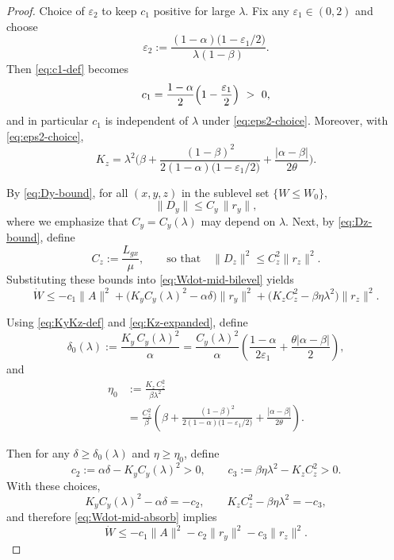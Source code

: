 \documentclass{article}
\newcommand{\1}{\mathbf{1}}
\begin{document}
\begin{proof}
\smallskip
\noindent Choice of $\varepsilon_2$ to keep $c_1$ positive for large $\lambda$.
Fix any $\varepsilon_1\in(0,2)$ and choose
\begin{equation}\label{eq:eps2-choice}
\varepsilon_2:=\frac{(1-\alpha)\bigl(1-\varepsilon_1/2\bigr)}{\lambda(1-\beta)}.
\end{equation}
Then \eqref{eq:c1-def} becomes
\begin{equation}\label{eq:c1-pos}
c_1=\frac{1-\alpha}{2}\Bigl(1-\frac{\varepsilon_1}{2}\Bigr)\ >\ 0,
\end{equation}
and in particular $c_1$ is independent of $\lambda$ under \eqref{eq:eps2-choice}.
Moreover, with \eqref{eq:eps2-choice},
\begin{equation}\label{eq:Kz-expanded}
K_z
=\lambda^2\Biggl(
\beta
+\frac{(1-\beta)^2}{2(1-\alpha)\bigl(1-\varepsilon_1/2\bigr)}
+\frac{|\alpha-\beta|}{2\theta}
\Biggr).
\end{equation}

\medskip
\noindent By \eqref{eq:Dy-bound}, for all $(x,y,z)$ in the sublevel set $\{W\le W_0\}$,
\[
\|D_y\|\le C_y\,\|r_y\|,
\]
where we emphasize that $C_y=C_y(\lambda)$ may depend on $\lambda$.
Next, by \eqref{eq:Dz-bound}, define
\[
C_z:=\frac{L_{gx}}{\mu},
\qquad\text{so that}\quad
\|D_z\|^2\le C_z^2\|r_z\|^2.
\]
Substituting these bounds into \eqref{eq:Wdot-mid-bilevel} yields
\begin{equation}\label{eq:Wdot-mid-absorb}
\dot W
\le -c_1\|A\|^{2}
   +\bigl(K_y C_y(\lambda)^{2}-\alpha\delta\bigr)\|r_y\|^{2}
   +\bigl(K_z C_z^{2}-\beta\eta\lambda^{2}\bigr)\|r_z\|^{2}.
\end{equation}

\smallskip
\noindent
Using \eqref{eq:KyKz-def} and \eqref{eq:Kz-expanded}, define
\begin{equation}\label{eq:delta0-explicit}
\delta_0(\lambda)
:=\frac{K_y\,C_y(\lambda)^2}{\alpha}
=
\frac{C_y(\lambda)^2}{\alpha}
\left(
\frac{1-\alpha}{2\varepsilon_1}
+
\frac{\theta|\alpha-\beta|}{2}
\right),
\end{equation}
and
\begin{align}
\eta_0
&:=\frac{K_z\,C_z^2}{\beta\lambda^2} \nonumber\\
&=
\frac{C_z^2}{\beta}
\left(
\beta
+
\frac{(1-\beta)^2}{2(1-\alpha)\bigl(1-\varepsilon_1/2\bigr)}
+
\frac{|\alpha-\beta|}{2\theta}
\right).
\label{eq:eta0-explicit}
\end{align}

Then for any $\delta\ge\delta_0(\lambda)$ and $\eta\ge\eta_0$, define
\[
c_2:=\alpha\delta-K_y C_y(\lambda)^{2}>0,
\qquad
c_3:=\beta\eta\lambda^{2}-K_z C_z^{2}>0.
\]
With these choices,
\[
K_y C_y(\lambda)^{2}-\alpha\delta=-c_2,
\qquad
K_z C_z^{2}-\beta\eta\lambda^{2}=-c_3,
\]
and therefore \eqref{eq:Wdot-mid-absorb} implies
\begin{equation}\label{eq:Wdot-final}
\dot W
\le -c_1\|A\|^{2}-c_2\|r_y\|^{2}-c_3\|r_z\|^{2}.
\end{equation}


\end{proof}
\end{document}
